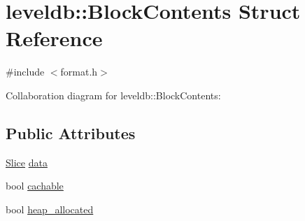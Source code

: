 \hypertarget{structleveldb_1_1_block_contents}{\section{leveldb\-:\-:Block\-Contents Struct Reference}
\label{structleveldb_1_1_block_contents}
}


{\ttfamily \#include $<$format.\-h$>$}



Collaboration diagram for leveldb\-:\-:Block\-Contents\-:
\subsection*{Public Attributes}
\begin{DoxyCompactItemize}
\item 
\hyperlink{classleveldb_1_1_slice}{Slice} \hyperlink{structleveldb_1_1_block_contents_aa30fe6388fe0f89d5565f6bae788c28e}{data}
\item 
bool \hyperlink{structleveldb_1_1_block_contents_ad9cbcf81fb1378ce5f9a0db2e8d4b539}{cachable}
\item 
bool \hyperlink{structleveldb_1_1_block_contents_a0d4390fa3d4041ac5a3da51cbb16e315}{heap\-\_\-allocated}
\end{DoxyCompactItemize}


